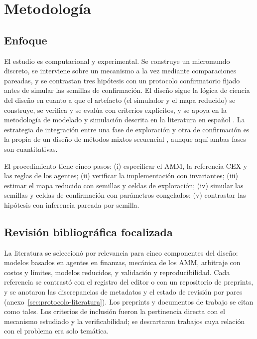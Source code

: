 \chapter{Metodología}
\label{cap:metodologia}

\section{Enfoque}

El estudio es computacional y experimental. Se construye un micromundo discreto, se interviene sobre un mecanismo a la vez mediante comparaciones pareadas, y se contrastan tres hipótesis con un protocolo confirmatorio fijado antes de simular las semillas de confirmación. El diseño sigue la lógica de ciencia del diseño \cite{hevner2004design} en cuanto a que el artefacto (el simulador y el mapa reducido) se construye, se verifica y se evalúa con criterios explícitos, y se apoya en la metodología de modelado y simulación descrita en la literatura en español \cite{hernandez2014metodologia}. La estrategia de integración entre una fase de exploración y otra de confirmación es la propia de un diseño de métodos mixtos secuencial \cite{creswell2018research}, aunque aquí ambas fases son cuantitativas.

El procedimiento tiene cinco pasos: (i) especificar el AMM, la referencia CEX y las reglas de los agentes; (ii) verificar la implementación con invariantes; (iii) estimar el mapa reducido con semillas y celdas de exploración; (iv) simular las semillas y celdas de confirmación con parámetros congelados; (v) contrastar las hipótesis con inferencia pareada por semilla.

\section{Revisión bibliográfica focalizada}

La literatura se seleccionó por relevancia para cinco componentes del diseño: modelos basados en agentes en finanzas, mecánica de los AMM, arbitraje con costos y límites, modelos reducidos, y validación y reproducibilidad. Cada referencia se contrastó con el registro del editor o con un repositorio de preprints, y se anotaron las discrepancias de metadatos y el estado de revisión por pares (anexo~\ref{sec:protocolo-literatura}). Los preprints y documentos de trabajo se citan como tales. Los criterios de inclusión fueron la pertinencia directa con el mecanismo estudiado y la verificabilidad; se descartaron trabajos cuya relación con el problema era solo temática.

